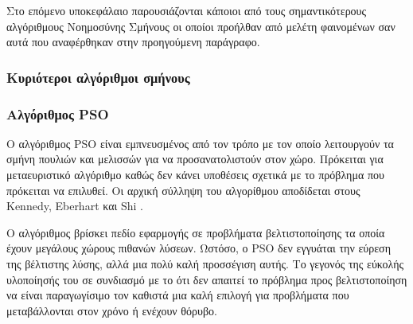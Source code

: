 \documentclass{assignment}
\begin{document}
Στο επόμενο υποκεφάλαιο παρουσιάζονται κάποιοι από τους σημαντικότερους
αλγόριθμους Νοημοσύνης Σμήνους οι οποίοι προήλθαν από μελέτη φαινομένων σαν
αυτά που αναφέρθηκαν στην προηγούμενη παράγραφο.
\subsubsection{Κυριότεροι αλγόριθμοι σμήνους}
\subsubsection*{Αλγόριθμος PSO}
O αλγόριθμος PSO είναι εμπνευσμένος από τον τρόπο με τον οποίο λειτουργούν
τα σμήνη πουλιών και μελισσών για να προσανατολιστούν στον χώρο. Πρόκειται για
μεταευριστικό αλγόριθμο καθώς δεν κάνει υποθέσεις σχετικά με το πρόβλημα που
πρόκειται να επιλυθεί. Οι αρχική σύλληψη του αλγορίθμου αποδίδεται στους
Kennedy, Eberhart και Shi \cite{kennedy2010particle}.

Ο αλγόριθμος βρίσκει πεδίο εφαρμογής σε προβλήματα βελτιστοποίησης τα οποία
έχουν μεγάλους χώρους πιθανών λύσεων. Ωστόσο, ο PSO δεν εγγυάται την εύρεση
της βέλτιστης λύσης, αλλά μια πολύ καλή προσσέγιση αυτής. Το γεγονός της εύκολής
υλοποίησής του σε συνδιασμό με το ότι δεν απαιτεί το πρόβλημα προς
βελτιστοποίηση να είναι παραγωγίσιμο \cite{kennedy2010particle} τον καθιστά μια
καλή επιλογή για προβλήματα που μεταβάλλονται στον χρόνο ή ενέχουν θόρυβο.
\end{document}
